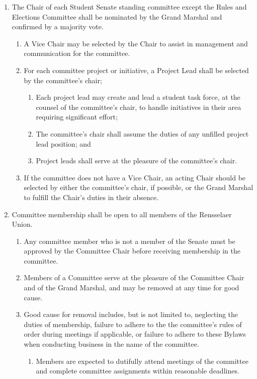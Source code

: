 \begin{enumerate}

    \item The Chair of each Student Senate standing committee except the Rules and Elections Committee shall be nominated by the Grand Marshal and confirmed by a majority vote.
    \begin{enumerate}
        \item A Vice Chair may be selected by the Chair to assist in management and communication for the committee.

        \item For each committee project or initiative, a Project Lead shall be selected by the committee's chair;
        \begin{enumerate}
            \item Each project lead may create and lead a student task force, at the counsel of the committee's chair, to handle initiatives in their area requiring significant effort;

            \item The committee's chair shall assume the duties of any unfilled project lead position; and

            \item Project leads shall serve at the pleasure of the committee's chair.
        \end{enumerate}

        \item If the committee does not have a Vice Chair, an acting Chair should be selected by either the committee's chair, if possible, or the Grand Marshal to fulfill the Chair's duties in their absence.
    \end{enumerate}

    \item Committee membership shall be open to all members of the Rensselaer Union.
    \begin{enumerate}
        \item Any committee member who is not a member of the Senate must be approved by the Committee Chair before receiving
        membership in the committee.

        \item Members of a Committee serve at the pleasure of the Committee Chair and of the Grand Marshal, and may be removed at
        any time for good cause.

        \item Good cause for removal includes, but is not limited to, neglecting the duties of membership, failure to adhere to the the committee's rules of order during meetings if applicable, or failure to adhere to these Bylaws when conducting business in the name of the committee.
        \begin{enumerate}
            \item Members are expected to dutifully attend meetings of the committee and complete committee assignments within reasonable deadlines.
        \end{enumerate}
    \end{enumerate}


\end{enumerate}
